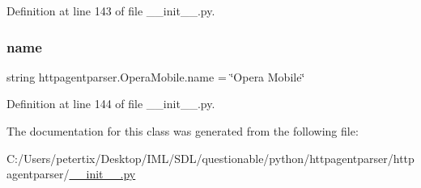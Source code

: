 Definition at line 143 of file \+\_\+\+\_\+init\+\_\+\+\_\+.\+py.

\hypertarget{classhttpagentparser_1_1_opera_mobile_aa26af89c14f81998311f93f8556b33ce}{}\label{classhttpagentparser_1_1_opera_mobile_aa26af89c14f81998311f93f8556b33ce} 
\subsubsection{\texorpdfstring{name}{name}}
{\footnotesize\ttfamily string httpagentparser.\+Opera\+Mobile.\+name = \char`\"{}Opera Mobile\char`\"{}\hspace{0.3cm}{\ttfamily [static]}}



Definition at line 144 of file \+\_\+\+\_\+init\+\_\+\+\_\+.\+py.



The documentation for this class was generated from the following file\+:\begin{DoxyCompactItemize}
\item 
C\+:/\+Users/petertix/\+Desktop/\+I\+M\+L/\+S\+D\+L/questionable/python/httpagentparser/httpagentparser/\hyperlink{____init_____8py}{\+\_\+\+\_\+init\+\_\+\+\_\+.\+py}\end{DoxyCompactItemize}

